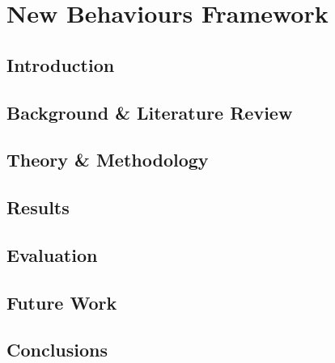 \chapter{New Behaviours Framework}
\label{chap:rl}

\section{Introduction}

\cite{SampleCitation}

\section{Background \& Literature Review}
\section{Theory \& Methodology}
\section{Results}
\section{Evaluation}
\section{Future Work}
\section{Conclusions}
